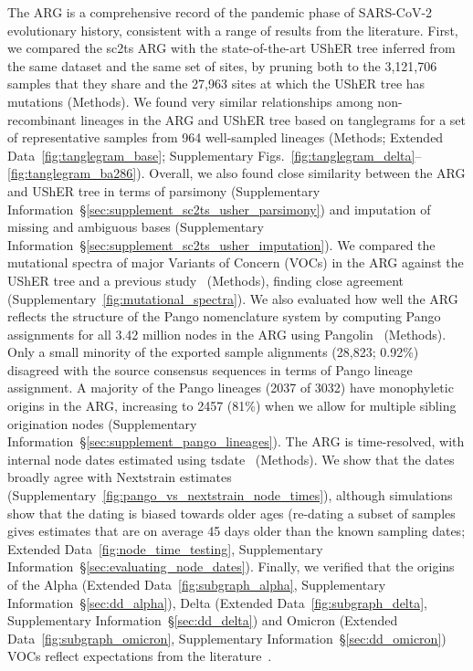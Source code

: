 \documentclass[12pt]{article}
\makeatletter
\newcommand{\supref}[1]{Supplementary Information~\S\ref{#1}}
\newcommand{\edref}[1]{Extended Data~\ref{#1}}
\newcommand{\siref}[1]{Supplementary~\ref{#1}}
\newcommand{\refprefix}[1]{#1~}
\newcommand{\numref}[1]{{\let\refprefix\@gobble\ref{#1}}}
\makeatother
\begin{document}
The ARG is a comprehensive record of
the pandemic phase of SARS-CoV-2 evolutionary history,
consistent with a range of results from the literature.
First, we compared the sc2ts ARG
with the state-of-the-art UShER tree inferred from the same dataset
and the same set of sites,
by pruning both to the 3,121,706 samples that they share
and the 27,963 sites at which the UShER tree has mutations (Methods).
We found very similar relationships among non-recombinant lineages in
the ARG and UShER tree based on tanglegrams
for a set of representative samples from 964 well-sampled lineages
(Methods; \edref{fig:tanglegram_base};
Supplementary Figs.~\numref{fig:tanglegram_delta}--\numref{fig:tanglegram_ba286}).
Overall, we also found close similarity between the ARG
and UShER tree in terms of parsimony
(\supref{sec:supplement_sc2ts_usher_parsimony})
and imputation of missing and ambiguous bases
(\supref{sec:supplement_sc2ts_usher_imputation}).
We compared the mutational spectra of major Variants of Concern (VOCs) in the ARG
against the UShER tree and a previous study~\cite{Bloom2023} (Methods),
finding close agreement (\siref{fig:mutational_spectra}).
We also evaluated how well the ARG reflects the structure of
the Pango nomenclature system
by computing Pango assignments for all 3.42 million nodes in the ARG
using Pangolin~\cite{OToole2021assignment} (Methods).
Only a small minority of the exported sample alignments (28,823; 0.92\%) disagreed
with the source consensus sequences in terms of Pango lineage assignment.
A majority of the Pango lineages (2037 of 3032)
have monophyletic origins in the ARG,
increasing to 2457 (81\%) when we allow
for multiple sibling origination nodes
(\supref{sec:supplement_pango_lineages}).
The ARG is time-resolved, with internal node dates estimated
using tsdate~\cite{Pope2025} (Methods).
We show that the dates broadly agree with
Nextstrain estimates (\siref{fig:pango_vs_nextstrain_node_times}),
although simulations show that the dating is biased towards older ages
(re-dating a subset of samples gives estimates that are on average
45 days older than the known sampling dates; \edref{fig:node_time_testing},
\supref{sec:evaluating_node_dates}).
Finally, we verified
that the origins of the
Alpha (\edref{fig:subgraph_alpha}, \supref{sec:dd_alpha}),
Delta (\edref{fig:subgraph_delta}, \supref{sec:dd_delta})
and
Omicron (\edref{fig:subgraph_omicron}, \supref{sec:dd_omicron})
VOCs reflect expectations from the literature~\cite{RambautAlpha2020,ECDCreport,
Cherian2021,Farinholt2021,Stern2021,Dor2025,RambautOmicron2021}.
\end{document}
